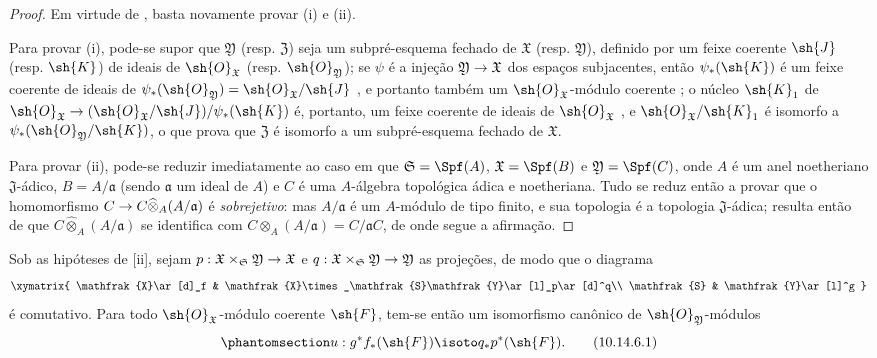 \documentclass[oneside]{amsart}
\makeatletter
\newcommand{\ega@arrow}[2]{\mathchoice{#1}{#2}{#2}{#2}}
\renewcommand{\to}{\ega@arrow{\longrightarrow}{\rightarrow}}
\let\EGAOriginalLabel\label
\renewcommand{\label}[1]{\phantomsection\EGAOriginalLabel{#1}}
\makeatother
\begin{document}
\begin{proof}
Em virtude de , basta novamente provar (i) e (ii).

Para provar (i), pode-se supor que $\mathfrak{Y}$ (resp. $\mathfrak{Z}$) seja um subpré-esquema fechado de $\mathfrak{X}$ (resp. $\mathfrak{Y}$), definido por um feixe coerente $\sh{J}$ (resp. $\sh{K}$) de ideais de $\sh{O}_\mathfrak{X}$ (resp. $\sh{O}_\mathfrak{Y}$);
se $\psi$ é a injeção $\mathfrak{Y}\to\mathfrak{X}$ dos espaços subjacentes, então $\psi_*(\sh{K})$ é um feixe coerente de ideais de $\psi_*(\sh{O}_\mathfrak{Y})=\sh{O}_\mathfrak{X}/\sh{J}$ , e portanto também um $\sh{O}_\mathfrak{X}$-módulo coerente ;
o núcleo $\sh{K}_1$ de $\sh{O}_\mathfrak{X}\to(\sh{O}_\mathfrak{X}/\sh{J})/\psi_*(\sh{K})$ é, portanto, um feixe coerente de ideais de $\sh{O}_\mathfrak{X}$ , e $\sh{O}_\mathfrak{X}/\sh{K}_1$ é isomorfo a $\psi_*(\sh{O}_\mathfrak{Y}/\sh{K})$, o que prova que $\mathfrak{Z}$ é isomorfo a um subpré-esquema fechado de $\mathfrak{X}$.

Para provar (ii), pode-se reduzir imediatamente ao caso em que $\mathfrak{S}=\Spf(A)$, $\mathfrak{X}=\Spf(B)$ e $\mathfrak{Y}=\Spf(C)$, onde $A$ é um anel noetheriano $\mathfrak{J}$-ádico, $B=A/\mathfrak{a}$ (sendo $\mathfrak{a}$ um ideal de $A$) e $C$ é uma $A$-álgebra topológica ádica e noetheriana.
Tudo se reduz então a provar que o homomorfismo $C\to C\widehat{\otimes}_A(A/\mathfrak{a})$ é \emph{sobrejetivo}:
mas $A/\mathfrak{a}$ é um $A$-módulo de tipo finito, e sua topologia é a topologia $\mathfrak{J}$-ádica;
resulta então de  que $C\widehat{\otimes}_A(A/\mathfrak{a})$ se identifica com $C\otimes_A(A/\mathfrak{a})=C/\mathfrak{a}C$, de onde segue a afirmação.
\end{proof}

\begin{corollary}[10.14.6]
\label{I.10.14.6}
Sob as hipóteses de [ii], sejam $p:\mathfrak{X}\times_\mathfrak{S}\mathfrak{Y}\to\mathfrak{X}$ e $q:\mathfrak{X}\times_\mathfrak{S}\mathfrak{Y}\to\mathfrak{Y}$ as projeções, de modo que o diagrama
\[
  \xymatrix{
    \mathfrak{X}\ar[d]_f &
    \mathfrak{X}\times_\mathfrak{S}\mathfrak{Y}\ar[l]_p\ar[d]^q\\
    \mathfrak{S} &
    \mathfrak{Y}\ar[l]^g
  }
\]
é comutativo.
Para todo $\sh{O}_\mathfrak{X}$-módulo coerente $\sh{F}$, tem-se então um isomorfismo canônico de $\sh{O}_\mathfrak{Y}$-módulos
\[
\label{I.10.14.6.1}
  u:g^*f_*(\sh{F})\isoto q_*p^*(\sh{F}).
  \tag{10.14.6.1}
\]
\end{corollary}
\end{document}
